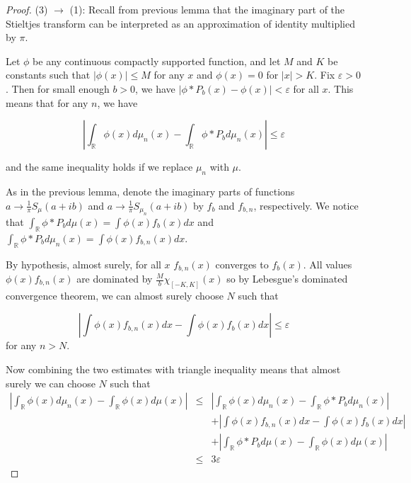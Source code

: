 \documentclass[12pt,a4paper,leqno]{report}
\newcommand{\R}{\mathbb{R}}
\newcommand{\eps}{\varepsilon}
\theoremstyle{plain}
\theoremstyle{definition}
\theoremstyle{remark}
\begin{document}
\begin{proof}
(3) $\rightarrow$ (1): Recall from previous lemma that the imaginary part of the Stieltjes transform can be interpreted as an approximation of identity multiplied by $\pi$.

Let $\phi$ be any continuous compactly supported function, and let $M$ and $K$ be constants such that $|\phi(x)|\leq M$ for any $x$ and $\phi(x)=0$ for $|x|>K$. Fix $\eps > 0$. 
Then for small enough $b>0$, we have $|\phi * P_b (x)-\phi(x)| < \eps$ for all $x$. This means that for any $n$, we have 

\begin{equation*}
|\int_{\R} \phi(x) d\mu_n(x) - \int_{\R} \phi * P_b d\mu_n(x)| \leq \eps
\end{equation*} 

and the same inequality holds if we replace $\mu_n$ with $\mu$.

As in the previous lemma, denote the imaginary parts of functions $a  \to \frac{1}{\pi} S_{\mu}(a+ib)$ and $a  \to \frac{1}{\pi} S_{\mu_n}(a+ib)$ by $f_b$ and $f_{b,n}$, respectively.  We notice that $\int_{\R} \phi * P_b d\mu(x) = \int \phi(x) f_{b}(x) dx$ and $\int_{\R} \phi * P_b d\mu_n(x) = \int \phi(x) f_{b,n}(x) dx$.

By hypothesis, almost surely, for all $x$ $f_{b,n}(x)$ converges to $f_b(x)$. All values $\phi(x) f_{b,n}(x)$ are dominated by $\frac{M}{b} \chi_{[-K,K]} (x)$ so by Lebesgue's dominated convergence theorem, we can almost surely choose $N$ such that

\begin{equation*}
|\int \phi(x) f_{b,n}(x) dx - \int \phi(x) f_{b}(x) dx| \leq \eps 
\end{equation*}
for any $n>N$.

Now combining the two estimates with triangle inequality means that almost surely we can choose $N$ such that
\begin{eqnarray*}
|\int_{\R} \phi(x) d\mu_n(x) - \int_{\R} \phi(x) d\mu(x)| & \leq &
|\int_{\R} \phi(x) d\mu_n(x) - \int_{\R} \phi * P_b d\mu_n(x)|\\
&  & + |\int \phi(x) f_{b,n}(x) dx - \int \phi(x) f_{b}(x) dx|\\
& & + | \int_{\R} \phi * P_b d\mu(x)- \int_{\R} \phi(x) d\mu(x)|\\
& \leq & 3\eps
\end{eqnarray*}


\end{proof}
\end{document}
